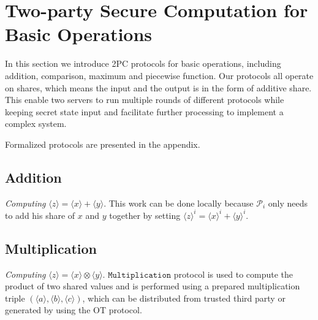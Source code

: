 \documentclass[letterpaper]{article} %
\begin{document}
    
    
    \section{Two-party Secure Computation for Basic Operations}
    
    In this section we introduce 2PC protocols for basic operations, 
    including addition, comparison, maximum and piecewise function.
    Our protocols all operate on shares, which means
    the input and the output is in the form of additive share.
    This enable two servers to run multiple rounds of different
    protocols while keeping secret state input 
    and facilitate further processing to implement a complex system.

    Formalized protocols are presented in the appendix.

    \subsection{Addition}
    
    \emph{Computing} $ \langle z\rangle  = \langle x\rangle  + \langle y\rangle $. This work can be done locally because 
    $\mathcal{P}_{i}$ only needs to add his share of $x$ and $y$ together by setting $\langle z\rangle^{i}  = \langle x\rangle^{i}  + \langle y\rangle^{i} $.
    
    
    
    \subsection{Multiplication}
    \emph{Computing} $ \langle z\rangle  = \langle x\rangle  \otimes \langle y\rangle $.
    $\mathtt{Multiplication}$ protocol is used to compute the product of two shared values and is performed 
    using a prepared multiplication triple $(\langle a\rangle,\langle b\rangle,\langle c\rangle)$, 
    which can be distributed from trusted third party or 
    generated by using the OT protocol.
    
\end{document}
